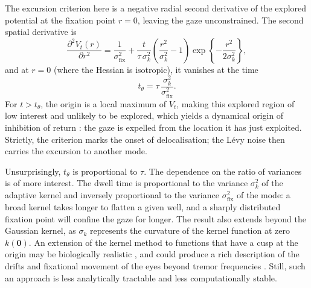 The excursion criterion here is a negative radial second derivative of the explored potential at the fixation point $r=0$, leaving the gaze unconstrained. The second spatial derivative is
\begin{equation*}
    \frac{\partial^2 V_t(r)}{\partial r^2} = \frac{1}{\sigma_{\text{fix}}^2} + \frac{t}{\tau\,\sigma_k^2}\left(\frac{r^2}{\sigma_k^2} - 1\right)\exp\left\{-\frac{r^2}{2\sigma_k^2}\right\},
\end{equation*}
and at $r=0$ (where the Hessian is isotropic), it vanishes at the time
\begin{equation}\label{eq:theta_rhythm}
    t_{\theta} = \tau\,\frac{\sigma_k^2}{\sigma_{\text{fix}}^2}.
\end{equation}
For $t>t_\theta$, the origin is a local maximum of $V_t$, making this explored region of low interest and unlikely to be explored, which yields a dynamical origin of inhibition of return \cite{redden_inhibition_2021, van_ede_looking_2026, kingstone_inhibition_1999, klein_visual_2023, henderson_oculomotor_2012, ludwig_mechanism_2009}: the gaze is expelled from the location it has just exploited. Strictly, the criterion marks the onset of delocalisation; the Lévy noise then carries the excursion to another mode.

Unsurprisingly, $t_\theta$ is proportional to $\tau$. The dependence on the ratio of variances is of more interest. The dwell time is proportional to the variance $\sigma_k^2$ of the adaptive kernel and inversely proportional to the variance $\sigma_{\text{fix}}^2$ of the mode: a broad kernel takes longer to flatten a given well, and a sharply distributed fixation point will confine the gaze for longer. The result also extends beyond the Gaussian kernel, as $\sigma_k$ represents the curvature of the kernel function at zero $k(\mathbf{0})$. An extension of the kernel method to functions that have a cusp at the origin may be biologically realistic \cite{geisler_real-time_1998, levi_vernier_1985, strasburger_peripheral_2011}, and could produce a rich description of the drifts and fixational movement of the eyes beyond tremor frequencies \cite{wu_fixational_2024, rucci_control_2015}. Still, such an approach is less analytically tractable and less computationally stable.

